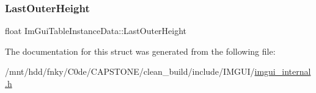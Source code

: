 \subsubsection{\texorpdfstring{Last\+Outer\+Height}{LastOuterHeight}}
{\footnotesize\ttfamily float Im\+Gui\+Table\+Instance\+Data\+::\+Last\+Outer\+Height}



The documentation for this struct was generated from the following file\+:\begin{DoxyCompactItemize}
\item 
/mnt/hdd/fnky/\+C0de/\+C\+A\+P\+S\+T\+O\+N\+E/clean\+\_\+build/include/\+I\+M\+G\+U\+I/\hyperlink{imgui__internal_8h}{imgui\+\_\+internal.\+h}\end{DoxyCompactItemize}
